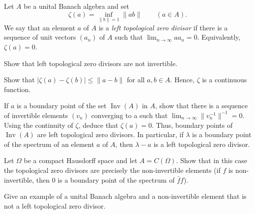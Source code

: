 \documentclass{article}
\DeclareMathOperator{\Inv}{Inv}
\begin{document}
\begin{prb}
Let $A$ be a unital Banach algebra and set
\[\zeta(a)=\inf_{\|b\|=1}\|ab\|\qquad(a\in A).\]
We say that an element $a$ of $A$ is a \emph{left topological zero divisor} if there is a sequence of unit vectors $(a_n)$ of $A$ such that $\lim_{n\to\infty}aa_n=0$.
Equivalently, $\zeta(a)=0$.
\begin{parts}
\item
Show that left topological zero divisors are not invertible.
\item
Show that $|\zeta(a)-\zeta(b)|\le\|a-b\|$ for all $a,b\in A$.
Hence, $\zeta$ is a continuous function.
\item
If $a$ is a boundary point of the set $\Inv(A)$ in $A$, show that there is a sequence of invertible elements $(v_n)$ converging to a such that $\lim_{n\to\infty}\|v_n^{-1}\|^{-1}=0$.
Using the continuity of $\zeta$, deduce that $\zeta(a)=0$.
Thus, boundary points of $\Inv(A)$ are left topological zero divisors.
In particular, if $\lambda$ is a boundary point of the spectrum of an element $a$ of $A$, then $\lambda-a$ is a left topological zero divisor.
\item
Let $\Omega$ be a compact Hausdorff space and let $A=C(\Omega)$.
Show that in this case the topological zero divisors are precisely the non-invertible elements (if $f$ is non-invertible, then 0 is a boundary point of the spectrum of $\bar ff$).
\item
Give an example of a unital Banach algebra and a non-invertible element that is not a left topological zero divisor.
\end{parts}
\end{prb}
\end{document}
